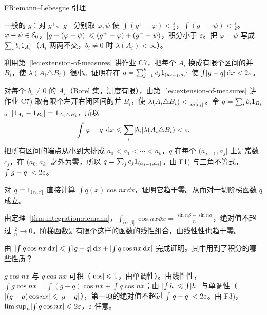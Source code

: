 \begin{probleme}{F}{Riemann--Lebesgue 引理}
\begin{questions}
\begin{solution}
一般的 $g$：对 $g^+$、$g^-$ 分别取 $\varphi,\psi$ 使 $\int(g^+-\varphi)<\frac\varepsilon2$，$\int(g^--\psi)<\frac\varepsilon2$。$\varphi-\psi\in\mathcal{E}_0$，$\lvert g-(\varphi-\psi)\rvert\leqslant(g^+-\varphi)+(g^--\psi)$，积分小于 $\varepsilon$。把 $\varphi-\psi$ 写成 $\sum_ib_i1_{A_i}$（$A_i$ 两两不交，$b_i\neq0$ 时 $\lambda(A_i)<\infty$）。
\end{solution}
\item 利用第~\ref{lec:extension-of-measures} 讲作业 C7，把每个 $A_i$ 换成有限个区间的并 $B_i$，使 $\lambda(A_i\triangle B_i)$ 很小。证明存在 $q=\sum_{j=1}^kc_j1_{(a_{j-1},a_j]}$ 使 $\int\lvert g-q\rvert\,\mathrm{d} x<2\varepsilon$。
\begin{solution}
对每个 $b_i\neq0$ 的 $A_i$（Borel 集，测度有限），由第~\ref{lec:extension-of-measures} 讲作业 C7) 取有限个左开右闭区间的并 $B_i$，使 $\lambda(A_i\triangle B_i)<\frac\varepsilon{m\lvert b_i\rvert}$。令 $q=\sum_ib_i1_{B_i}$。$\lvert 1_{A_i}-1_{B_i}\rvert=1_{A_i\triangle B_i}$，所以
\[
\int\lvert \varphi-q\rvert\,\mathrm{d} x\leqslant\sum_i\lvert b_i\rvert\lambda(A_i\triangle B_i)<\varepsilon .
\]
把所有区间的端点从小到大排成 $a_0<a_1<\cdots<a_k$，$q$ 在每个 $(a_{j-1},a_j]$ 上是常数 $c_j$，在 $(a_0,a_k]$ 之外为零，所以 $q=\sum_jc_j1_{(a_{j-1},a_j]}$。由 F1) 与三角不等式，$\int\lvert g-q\rvert<2\varepsilon$。
\end{solution}
\item 对 $q=1_{(\alpha,\beta]}$ 直接计算 $\int q(x)\cos nx\dd x$，证明它趋于零。从而对一切阶梯函数 $q$ 成立。
\begin{solution}
由定理~\ref{thm:integration:riemann}，$\int_{(\alpha,\beta]}\cos nx\dd x=\frac{\sin n\beta-\sin n\alpha}n$，绝对值不超过 $\frac2n\to0$。阶梯函数是有限个这样的函数的线性组合，由线性性也趋于零。
\end{solution}
\item 由 $\lvert \int g\cos nx\,\mathrm{d} x\rvert\leqslant\int\lvert g-q\rvert\,\mathrm{d} x+\lvert \int q\cos nx\,\mathrm{d} x\rvert$ 完成证明。其中用到了积分的哪些性质？
\begin{solution}
$g\cos nx$ 与 $q\cos nx$ 可积（$\lvert \cos\rvert\leqslant1$，由单调性）。由线性性，$\int g\cos nx=\int(g-q)\cos nx+\int q\cos nx$；由 $\lvert \int h\rvert\leqslant\int\lvert h\rvert$ 与单调性（$\lvert (g-q)\cos nx\rvert\leqslant\lvert g-q\rvert$），第一项的绝对值不超过 $\int\lvert g-q\rvert<2\varepsilon$。由 F3)，$\limsup_n\lvert \int g\cos nx\rvert\leqslant2\varepsilon$，$\varepsilon$ 任意。


\end{solution}
\end{questions}
\end{probleme}
